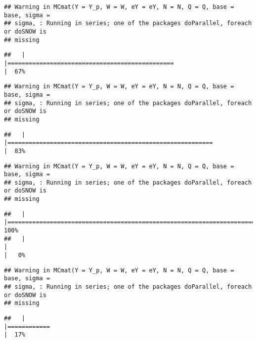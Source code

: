 \documentclass[]{article}
\begin{document}
\begin{verbatim}
## Warning in MCmat(Y = Y_p, W = W, eY = eY, N = N, Q = Q, base = base, sigma =
## sigma, : Running in series; one of the packages doParallel, foreach or doSNOW is
## missing
\end{verbatim}

\begin{verbatim}
##   |                                                                              |===============================================                       |  67%
\end{verbatim}

\begin{verbatim}
## Warning in MCmat(Y = Y_p, W = W, eY = eY, N = N, Q = Q, base = base, sigma =
## sigma, : Running in series; one of the packages doParallel, foreach or doSNOW is
## missing
\end{verbatim}

\begin{verbatim}
##   |                                                                              |==========================================================            |  83%
\end{verbatim}

\begin{verbatim}
## Warning in MCmat(Y = Y_p, W = W, eY = eY, N = N, Q = Q, base = base, sigma =
## sigma, : Running in series; one of the packages doParallel, foreach or doSNOW is
## missing
\end{verbatim}

\begin{verbatim}
##   |                                                                              |======================================================================| 100%
##   |                                                                              |                                                                      |   0%
\end{verbatim}

\begin{verbatim}
## Warning in MCmat(Y = Y_p, W = W, eY = eY, N = N, Q = Q, base = base, sigma =
## sigma, : Running in series; one of the packages doParallel, foreach or doSNOW is
## missing
\end{verbatim}

\begin{verbatim}
##   |                                                                              |============                                                          |  17%
\end{verbatim}
\end{document}
